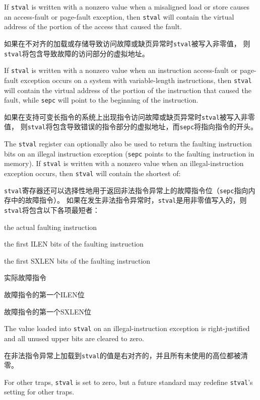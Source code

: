 If {\tt stval} is written with a nonzero value when a misaligned load or store
causes an access-fault or page-fault exception, then {\tt stval} will contain
the virtual address of the portion of the access that caused the fault.

如果在不对齐的加载或存储导致访问故障或缺页异常时{\tt stval}被写入非零值，
则{\tt stval}将包含导致故障的访问部分的虚拟地址。

If {\tt stval} is written with a nonzero value when an instruction access-fault
or page-fault exception occurs on a system with variable-length instructions,
then {\tt stval} will contain the virtual address of the portion of the
instruction that caused the fault, while {\tt sepc} will point to the beginning
of the instruction.

如果在支持可变长指令的系统上出现指令访问故障或缺页异常时{\tt stval}被写入非零值，
则{\tt stval}将包含导致错误的指令部分的虚拟地址，而{\tt sepc}将指向指令的开头。

The {\tt stval} register can optionally also be used to return the faulting
instruction bits on an illegal instruction exception ({\tt sepc} points to the
faulting instruction in memory).
If {\tt stval} is written with a nonzero value when an illegal-instruction
exception occurs, then {\tt stval} will contain the shortest of:

{\tt stval}寄存器还可以选择性地用于返回非法指令异常上的故障指令位（{\tt sepc}指向内存中的故障指令）。
如果在发生非法指令异常时，{\tt stval}是用非零值写入的，则{\tt stval}将包含以下各项最短者：
\begin{compactitem}
\item the actual faulting instruction
\item the first ILEN bits of the faulting instruction
\item the first SXLEN bits of the faulting instruction

\item 实际故障指令
\item 故障指令的第一个ILEN位
\item 故障指令的第一个SXLEN位
\end{compactitem}
The value loaded into {\tt stval} on an illegal-instruction exception is
right-justified and all unused upper bits are cleared to zero.

在非法指令异常上加载到{\tt stval}的值是右对齐的，并且所有未使用的高位都被清零。

For other traps, {\tt stval} is set to zero, but a future standard may
redefine {\tt stval}'s setting for other traps.

